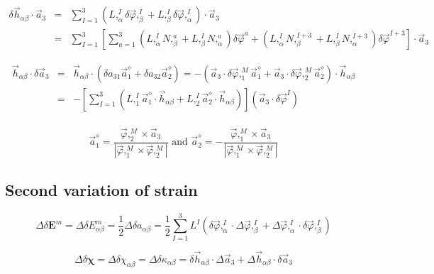 \documentclass[12pt]{article}
\begin{document}
\begin{eqnarray}
\delta\vec{h}_{\alpha\beta}\cdot\vec{a}_3 &=& \sum_{I=1}^3 (L,^I_{\alpha}
\delta\vec{\varphi},^I_{\beta} + L,^I_{\beta}\delta\vec{\varphi},^I_{\alpha})
\cdot\vec{a}_3 \nonumber \\
 &=& \sum_{I=1}^3\left[
   \sum_{a=1}^3(L,^I_{\alpha}N,^a_{\beta}
 + L,^I_{\beta}N,^a_{\alpha})\delta\vec{\varphi}^a
 + (L,^I_{\alpha}N,^{I+3}_{\beta}
 + L,^I_{\beta}N,^{I+3}_{\alpha})\delta\vec{\varphi}^{I+3}
 \right]\cdot\vec{a}_3
\end{eqnarray}

\begin{eqnarray}
\vec{h}_{\alpha\beta}\cdot\delta\vec{a}_3 &=& \vec{h}_{\alpha\beta}\cdot
(\delta a_{31}\vec{a}^{\diamond}_1 + \delta a_{32} \vec{a}^{\diamond}_2)
 = -(\vec{a}_3\cdot\delta\vec{\varphi},^M_1\vec{a}^{\diamond}_1
 + \vec{a}_3\cdot\delta\vec{\varphi},^M_2 \vec{a}^{\diamond}_2)
 \cdot\vec{h}_{\alpha\beta} \nonumber \\
 &=&-\left[ \sum^3_{I=1}\left( L,^I_1\vec{a}^{\diamond}_1\cdot\vec{h}_{\alpha\beta}
  + L,^I_2\vec{a}^{\diamond}_2\cdot\vec{h}_{\alpha\beta}\right)
    \right](\vec{a}_3\cdot\delta\vec{\varphi}^I) \\
\end{eqnarray}

\begin{equation}
\vec{a}^{\diamond}_1 = \frac{\vec{\varphi},^M_2\times\vec{a}_3}
{|\vec{\varphi},^M_1\times\vec{\varphi},^M_2|}
\mbox{ and }
\vec{a}^{\diamond}_2 = -\frac{\vec{\varphi},^M_1\times\vec{a}_3}
{|\vec{\varphi},^M_1\times\vec{\varphi},^M_2|}
\end{equation}

%
\subsection{Second variation of strain}
%
\begin{equation}
\Delta\delta\pmb{E}^m = \Delta\delta E^m_{\alpha\beta}
 = \frac{1}{2}\Delta\delta a_{\alpha\beta}
 = \frac{1}{2}\sum^3_{I=1} L^I (\delta\vec{\varphi},^I_{\alpha}
 \cdot\Delta\vec{\varphi},^I_{\beta}
 + \Delta\vec{\varphi},^I_{\alpha}\cdot\delta\vec{\varphi},^I_{\beta})
\end{equation}

\begin{equation}
\Delta\delta\pmb{\chi} = \Delta\delta \chi_{\alpha\beta}
 = \Delta\delta \kappa_{\alpha\beta}
 = \delta\vec{h}_{\alpha\beta}\cdot\Delta\vec{a}_3
 + \Delta\vec{h}_{\alpha\beta}\cdot\delta\vec{a}_3
\end{equation}
\end{document}
